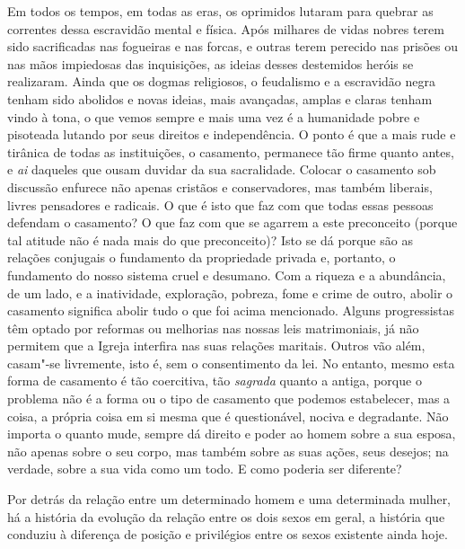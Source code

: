 Em todos os tempos, em todas as eras, os oprimidos lutaram para quebrar
as correntes dessa escravidão mental e física. Após milhares de vidas
nobres terem sido sacrificadas nas fogueiras e nas forcas, e outras
terem perecido nas prisões ou nas mãos impiedosas das inquisições, as
ideias desses destemidos heróis se realizaram. Ainda que os
dogmas religiosos, o feudalismo e a escravidão negra tenham sido abolidos e
novas ideias, mais avançadas, amplas e claras tenham vindo à tona, o que vemos
sempre e mais uma vez é a humanidade pobre e pisoteada lutando por seus
direitos e independência. O ponto é que a mais rude e tirânica de todas
as instituições, o casamento, permanece tão firme quanto antes, e \textit{ai}
daqueles que ousam duvidar da sua sacralidade. Colocar o casamento sob
discussão enfurece não apenas cristãos e conservadores, mas também
liberais, livres pensadores e radicais. O que é isto que faz com que
todas essas pessoas defendam o casamento? O que faz com que se agarrem a
este preconceito (porque tal atitude não é nada mais do que
preconceito)? Isto se dá porque são as relações conjugais o fundamento
da propriedade privada e, portanto, o fundamento do nosso sistema cruel\label{cruel}
e desumano. Com a riqueza e a abundância, de um lado, e a inatividade,
exploração, pobreza, fome e crime de outro, abolir o casamento significa
abolir tudo o que foi acima mencionado. Alguns progressistas têm optado
por reformas ou melhorias nas nossas leis matrimoniais, já não permitem
que a Igreja interfira nas suas relações maritais. Outros vão além,
casam"-se livremente, isto é, sem o consentimento da lei. No entanto,
mesmo esta forma de casamento é tão coercitiva, tão \textit{sagrada} quanto
a antiga, porque o problema não é a forma ou o tipo de casamento que
podemos estabelecer, mas a coisa, a própria coisa em si mesma que é
questionável, nociva e degradante. Não importa o quanto mude, sempre dá
direito e poder ao homem sobre a sua esposa, não apenas sobre o seu corpo,
mas também sobre as suas ações, seus desejos; na verdade, sobre a sua vida
como um todo. E como poderia ser diferente?

Por detrás da relação entre um determinado homem e uma determinada
mulher, há a história da evolução da relação entre os dois sexos em
geral, a história que conduziu à diferença de posição e privilégios
entre os sexos existente ainda hoje.

